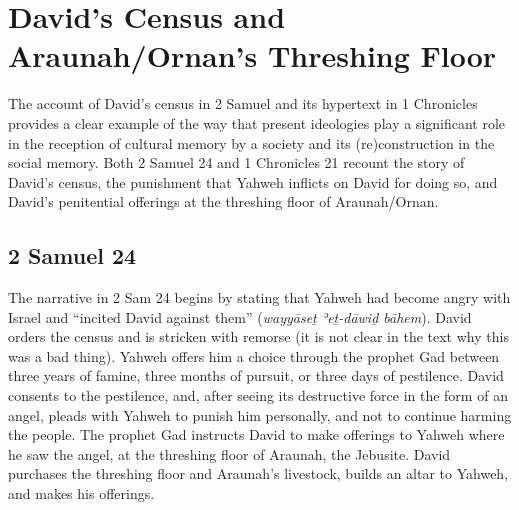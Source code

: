  \hypertarget{davids-census-and-araunahornans-threshing-floor}{%
 \section{David's Census and Araunah/Ornan's Threshing Floor}\label{davids-census-and-araunahornans-threshing-floor}} 

 The account of David's census in 2 Samuel and its hypertext in 1 Chronicles provides a clear example of the way that present ideologies play a significant role in the reception of cultural memory by a society and its (re)construction in the social memory. Both 2 Samuel 24 and 1 Chronicles 21 recount the story of David's census, the punishment that Yahweh inflicts on David for doing so, and David's penitential offerings at the threshing floor of Araunah/Ornan. 

 \hypertarget{samuel-24}{%
 \subsection{2 Samuel 24}\label{samuel-24}} 

 The narrative in 2 Sam 24 begins by stating that Yahweh had become angry with Israel and ``incited David against them'' (\emph{wayyāseṯ ʾeṯ-dāwiḏ bāhem}). David orders the census and is stricken with remorse (it is not clear in the text why this was a bad thing). Yahweh offers him a choice through the prophet Gad between three years of famine, three months of pursuit, or three days of pestilence. David consents to the pestilence, and, after seeing its destructive force in the form of an angel, pleads with Yahweh to punish him personally, and not to continue harming the people. The prophet Gad instructs David to make offerings to Yahweh where he saw the angel, at the threshing floor of Araunah, the Jebusite. David purchases the threshing floor and Araunah's livestock, builds an altar to Yahweh, and makes his offerings. 


